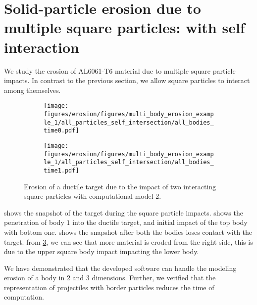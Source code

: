 \FloatBarrier%
\section{Solid-particle erosion due to multiple square particles: with
  self interaction}
\label{sec:erosion-multiple-impact-self-interact}
We study the erosion of AL6061-T6 material due to multiple square particle
impacts. In contrast to the previous section, we allow square particles to
interact among themselves.

\begin{figure}[!htpb]
  \centering
  \begin{subfigure}{0.48\textwidth}
    \centering
    \texttt{[image: figures/erosion/figures/multi\_body\_erosion\_example\_1/all\_particles\_self\_intersection/all\_bodies\_time0.pdf]}
    \subcaption{}
    \label{fig:mpe-1-full-a}
  \end{subfigure}
  \begin{subfigure}{0.48\textwidth}
    \centering
    \texttt{[image: figures/erosion/figures/multi\_body\_erosion\_example\_1/all\_particles\_self\_intersection/all\_bodies\_time1.pdf]}
    \subcaption{}
    \label{fig:mpe-1-full-b}
  \end{subfigure}
  \caption{Erosion of a ductile target due to the impact of two interacting
    square particles with computational model 2.}
\label{fig:mpe-1-full}
\end{figure}
 shows the snapshot of the target during the square
particle impacts.  shows the penetration of body $1$ into
the ductile target, and initial impact of the top body with bottom one.
 shows the snapshot after both the bodies loses contact
with the target. from \cref{fig:mpe-1-full}, we can see that more material is
eroded from the right side, this is due to the upper square body impact
impacting the lower body.


We have demonstrated that the developed software can handle the modeling erosion
of a body in 2 and 3 dimensions. Further, we verified that the representation of
projectiles with border particles reduces the time of computation.

